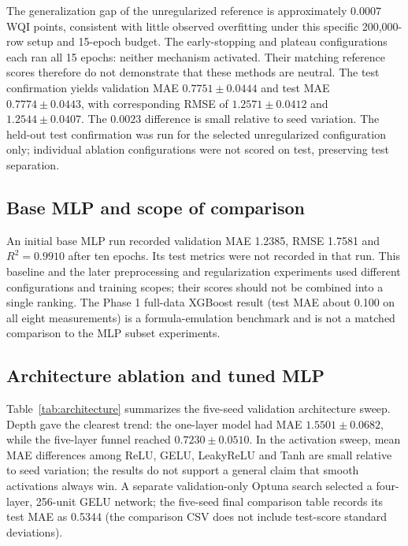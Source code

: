\documentclass[conference]{IEEEtran}
\begin{document}
The generalization gap of the unregularized reference is approximately $0.0007$ WQI points, consistent with little observed overfitting under this specific 200,000-row setup and 15-epoch budget. The early-stopping and plateau configurations each ran all 15 epochs: neither mechanism activated. Their matching reference scores therefore do not demonstrate that these methods are neutral. The test confirmation yields validation MAE $0.7751\pm0.0444$ and test MAE $0.7774\pm0.0443$, with corresponding RMSE of $1.2571\pm0.0412$ and $1.2544\pm0.0407$. The $0.0023$ difference is small relative to seed variation. The held-out test confirmation was run for the selected unregularized configuration only; individual ablation configurations were not scored on test, preserving test separation.

\subsection{Base MLP and scope of comparison}
An initial base MLP run recorded validation MAE 1.2385, RMSE 1.7581 and $R^2=0.9910$ after ten epochs. Its test metrics were not recorded in that run. This baseline and the later preprocessing and regularization experiments used different configurations and training scopes; their scores should not be combined into a single ranking. The Phase 1 full-data XGBoost result (test MAE about 0.100 on all eight measurements) is a formula-emulation benchmark and is not a matched comparison to the MLP subset experiments.

\subsection{Architecture ablation and tuned MLP}
Table~\ref{tab:architecture} summarizes the five-seed validation architecture sweep. Depth gave the clearest trend: the one-layer model had MAE $1.5501\pm0.0682$, while the five-layer funnel reached $0.7230\pm0.0510$. In the activation sweep, mean MAE differences among ReLU, GELU, LeakyReLU and Tanh are small relative to seed variation; the results do not support a general claim that smooth activations always win. A separate validation-only Optuna search selected a four-layer, 256-unit GELU network; the five-seed final comparison table records its test MAE as 0.5344 (the comparison CSV does not include test-score standard deviations).
\end{document}
